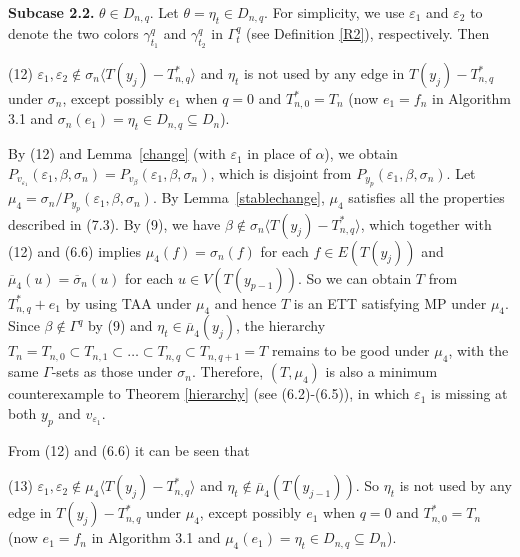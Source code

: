 \documentclass[11pt]{article}
\begin{document}
{\bf Subcase 2.2.} $\theta \in D_{n,q}$. Let $\theta=\eta_t \in D_{n,q}$. For simplicity, we use $\varepsilon_1$ and 
$\varepsilon_2$ to denote the two colors $\gamma^{q}_{t_1}$ and $\gamma^{q}_{t_2}$ in $\Gamma^{q}_t$ (see Definition 
\ref{R2}), respectively. Then

(12) $\varepsilon_1, \varepsilon_2 \notin \sigma_n \langle T(y_j) - T_{n,q}^* \rangle$ and  $\eta_t$ is not used by 
any edge in $T(y_j) -  T_{n,q}^*$ under $\sigma_n$, except possibly $e_1$ when $q=0$ and $T_{n,0}^*=T_n$ (now $e_1=f_n$ 
in Algorithm 3.1 and $\sigma_n(e_1)=\eta_t  \in  D_{n,q} \subseteq D_n$). 

By (12) and Lemma~\ref{change} (with $\varepsilon_1$ in place of $\alpha$), we obtain $P_{v_{\varepsilon_1}} (\varepsilon_1, 
\beta, \sigma_n) = P_{v_{\beta}}(\varepsilon_1, \beta, \sigma_n)$, which is disjoint from $P_{y_p}(\varepsilon_1, \beta, 
\sigma_n)$. Let $\mu_4=\sigma_n/P_{y_p}(\varepsilon_1, \beta, \sigma_n)$. By Lemma~\ref{stablechange},  $\mu_4$ satisfies all 
the properties described in (7.3). By (9), we have $\beta\notin \sigma_n \langle T(y_j) - T_{n,q}^* \rangle$,
which together with (12) and (6.6) implies $\mu_4(f)=\sigma_n(f)$ for each $f\in E(T(y_j))$ and $\overline{\mu}_4(u)=\overline{\sigma}_n(u)$ for each $u\in V(T(y_{p-1}))$.  So we can obtain $T$ from $T_{n,q}^*+e_1$ 
by using TAA under $\mu_4$ and hence $T$ is an ETT satisfying MP under $\mu_4$. Since $\beta \notin  \Gamma^q$ by (9)
and $\eta_t \in\overline{\mu}_4(y_j)$, the hierarchy $T_n=T_{n,0} \subset T_{n,1} \subset \ldots \subset 
T_{n,q} \subset T_{n,q+1}=T$ remains to be good under $\mu_4$, with the same $\Gamma$-sets as those under $\sigma_n$. 
Therefore, $(T, \mu_4)$ is also a minimum counterexample to Theorem \ref{hierarchy} (see (6.2)-(6.5)), in which 
$\varepsilon_1$ is missing at both $y_p$ and $v_{\varepsilon_1}$. 

From (12) and (6.6) it can be seen that 

(13) $\varepsilon_1, \varepsilon_2 \notin \mu_4 \langle T(y_j) - T_{n,q}^* \rangle$ and $\eta_t \notin 
\overline{\mu}_4(T(y_{j-1}))$. So $\eta_t$ is not used by any edge in $T(y_j)-T_{n,q}^*$ under $\mu_4$, except 
possibly $e_1$ when $q=0$ and $T_{n,0}^*=T_n$ (now $e_1=f_n$ in Algorithm 3.1 and $\mu_4(e_1)=\eta_t \in D_{n,q} \subseteq D_n$).  
\end{document}
